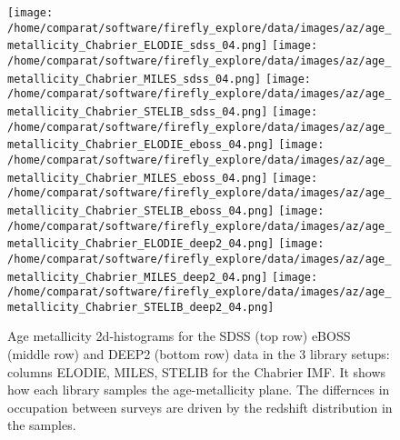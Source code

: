 \documentclass[onecolumn]{aa}
\begin{document}
\begin{figure}
\begin{center}
\caption{\label{fig:distributions:AZ} 
Age metallicity 2d-histograms for the SDSS (top row) eBOSS (middle row) and DEEP2 (bottom row) data in the 3 library setups: columns ELODIE, MILES, STELIB for the Chabrier IMF. 
It shows how each library samples the age-metallicity plane. 
The differnces in occupation between surveys are driven by the redshift distribution in the samples.}
\texttt{[image: /home/comparat/software/firefly\_explore/data/images/az/age\_metallicity\_Chabrier\_ELODIE\_sdss\_04.png]}
\texttt{[image: /home/comparat/software/firefly\_explore/data/images/az/age\_metallicity\_Chabrier\_MILES\_sdss\_04.png]}
\texttt{[image: /home/comparat/software/firefly\_explore/data/images/az/age\_metallicity\_Chabrier\_STELIB\_sdss\_04.png]}
\texttt{[image: /home/comparat/software/firefly\_explore/data/images/az/age\_metallicity\_Chabrier\_ELODIE\_eboss\_04.png]}
\texttt{[image: /home/comparat/software/firefly\_explore/data/images/az/age\_metallicity\_Chabrier\_MILES\_eboss\_04.png]}
\texttt{[image: /home/comparat/software/firefly\_explore/data/images/az/age\_metallicity\_Chabrier\_STELIB\_eboss\_04.png]}
\texttt{[image: /home/comparat/software/firefly\_explore/data/images/az/age\_metallicity\_Chabrier\_ELODIE\_deep2\_04.png]}
 \texttt{[image: /home/comparat/software/firefly\_explore/data/images/az/age\_metallicity\_Chabrier\_MILES\_deep2\_04.png]}
\texttt{[image: /home/comparat/software/firefly\_explore/data/images/az/age\_metallicity\_Chabrier\_STELIB\_deep2\_04.png]}
\end{center}
\end{figure}
\end{document}
